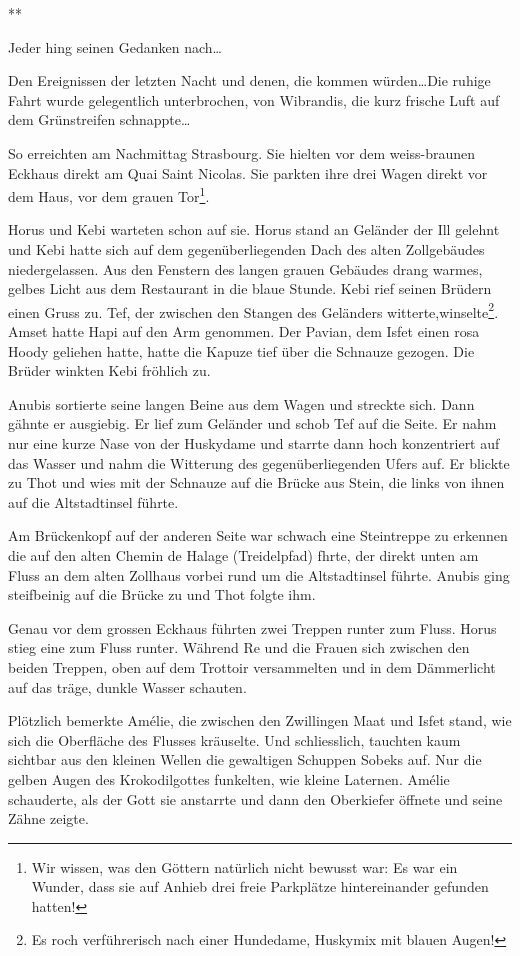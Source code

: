 \documentclass[11pt,titlepage,a5paper]{book}
\newcommand{\sterne}{\par{\centering ***\par}}
\begin{document}
\sterne

Jeder hing seinen Gedanken nach\dots

Den Ereignissen der letzten Nacht und denen, die kommen würden\dots Die ruhige Fahrt wurde gelegentlich unterbrochen, von Wibrandis, die kurz frische Luft auf dem Grünstreifen schnappte\dots

So erreichten am Nachmittag Strasbourg. Sie hielten vor dem weiss-braunen Eckhaus direkt am Quai Saint Nicolas. Sie parkten ihre drei Wagen direkt vor dem Haus, vor dem grauen Tor\footnote{Wir wissen, was den Göttern natürlich nicht bewusst war: Es war ein Wunder, dass sie auf Anhieb drei freie Parkplätze hintereinander gefunden hatten!}.

Horus und Kebi warteten schon auf sie. Horus stand an Geländer der Ill gelehnt und Kebi hatte sich auf dem gegenüberliegenden Dach des  alten Zollgebäudes niedergelassen. Aus den Fenstern des langen grauen Gebäudes drang warmes, gelbes Licht aus dem Restaurant in die blaue Stunde. Kebi rief seinen Brüdern einen Gruss zu. Tef, der zwischen den Stangen des Geländers witterte,winselte\footnote{Es roch verführerisch nach einer Hundedame, Huskymix mit blauen Augen!}. Amset hatte Hapi auf den Arm genommen. Der Pavian, dem Isfet einen rosa Hoody geliehen hatte, hatte die Kapuze tief über die Schnauze gezogen. Die Brüder winkten Kebi fröhlich zu.

Anubis sortierte seine langen Beine aus dem Wagen und streckte sich. Dann gähnte er ausgiebig. Er lief zum Geländer und schob Tef auf die Seite. Er nahm nur eine kurze Nase von der Huskydame und starrte dann hoch konzentriert auf das Wasser und nahm die Witterung des gegenüberliegenden Ufers auf. Er blickte zu Thot und wies mit der Schnauze auf die Brücke aus Stein, die links von ihnen auf die Altstadtinsel führte.

Am Brückenkopf auf der anderen Seite war schwach eine Steintreppe zu erkennen die auf den alten Chemin de Halage (Treidelpfad) fhrte, der direkt unten am Fluss an dem alten Zollhaus vorbei rund um die Altstadtinsel führte. Anubis ging steifbeinig auf die Brücke zu und Thot folgte ihm.

Genau vor dem grossen Eckhaus führten zwei Treppen runter zum Fluss. Horus stieg eine zum Fluss runter. Während Re und die Frauen sich zwischen den beiden Treppen, oben auf dem Trottoir versammelten und in dem Dämmerlicht auf das träge, dunkle Wasser schauten.

Plötzlich bemerkte Amélie, die zwischen den Zwillingen Maat und Isfet stand, wie sich die Oberfläche des Flusses kräuselte. Und schliesslich, tauchten kaum sichtbar aus den kleinen Wellen die gewaltigen Schuppen Sobeks auf. Nur die gelben Augen des Krokodilgottes funkelten, wie kleine Laternen. Amélie schauderte, als der Gott sie anstarrte und dann den Oberkiefer öffnete und seine Zähne zeigte.
\end{document}
